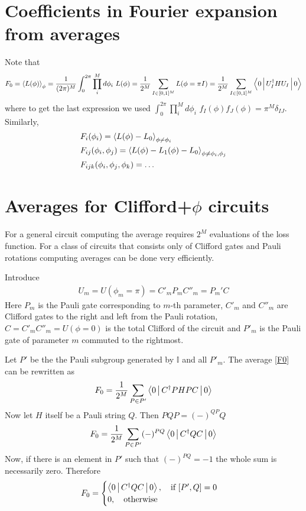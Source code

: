 \documentclass[12 pt]{article}
\begin{document}
\section{Coefficients in Fourier expansion from averages}
Note that 
\begin{align}
F_0=\Braket{L(\phi)}_\phi=\frac1{(2\pi)^M}\int_0^{2\pi}\prod_i^M d\phi_i\,\, L(\phi)=\frac1{2^M}\sum_{I\in [0, 1]^M} L(\phi=\pi I)=\frac1{2^M}\sum_{I\in [0,1]^M}\Braket{0|U_I^\dagger H U_I|0}\label{F0}
\end{align}
where to get the last expression we used $\int_0^{2\pi} \prod_i^Md\phi_i\,\, f_I(\phi)f_J(\phi)=\pi^M \delta_{IJ}$. Similarly,
\begin{align}
&F_i(\phi_i)=\Braket{L(\phi)-L_0}_{\phi\neq\phi_i}\\	&F_{ij}(\phi_i,\phi_j)=\Braket{L(\phi)-L_1(\phi)-L_0}_{\phi\neq \phi_i,\phi_j}\\
&F_{ijk}(\phi_i,\phi_j,\phi_k)=\dots
\end{align}
\section{Averages for Clifford+$\phi$ circuits}
For a general circuit computing the average requires $2^M$ evaluations of the loss function. For a class of circuits that consists only of Clifford gates and Pauli rotations computing averages can be done very efficiently.

Introduce
\begin{align}
	U_m=U(\phi_m=\pi)=C'_m P_m C''_m=P_m' C 
\end{align}
Here $P_m$ is the Pauli gate corresponding to $m$-th parameter, $C'_m$ and $C''_m$ are Clifford gates to the right and left from the Pauli rotation, $C=C'_mC''_m=U(\phi=0)$ is the total Clifford of the circuit and $P'_m$ is the Pauli gate of parameter $m$ commuted to the rightmost.

Let $P'$ be the the Pauli subgroup generated by $\mathbb{I}$ and all $P'_m$. The average \eqref{F0} can be rewritten as
\begin{align}
F_0=\frac1{2^M}\sum_{P\in P'}\Braket{0|C^\dagger PHPC|0}
\end{align}
Now let $H$ itself be a Pauli string $Q$. Then $PQP=(-)^{QP}Q$ 
\begin{align}
F_0=\frac1{2^M}\sum_{P\in P'}(-)^{PQ}\Braket{0|C^\dagger Q C|0}
\end{align}
Now, if there is an element in $P'$ such that $(-)^{PQ}=-1$ the whole sum is necessarily zero. Therefore
\begin{align}
F_0=\begin{cases}\Braket{0|C^\dagger Q C|0},\quad \text{if } [P', Q]=0\\0,\quad \text{otherwise}\end{cases}
\end{align}
\end{document}
